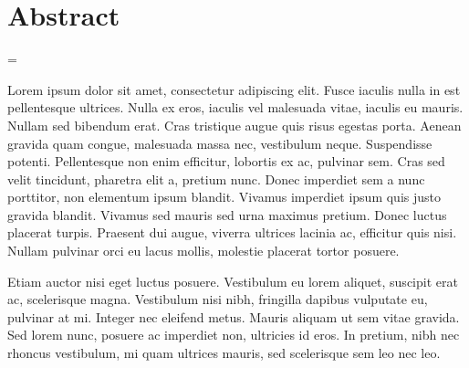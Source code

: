 \chapter*{Abstract}

\emergencystretch=\maxdimen
{}

Lorem ipsum dolor sit amet, consectetur adipiscing elit. Fusce iaculis nulla in est pellentesque ultrices. Nulla ex eros, iaculis vel malesuada vitae, iaculis eu mauris. Nullam sed bibendum erat. Cras tristique augue quis risus egestas porta. Aenean gravida quam congue, malesuada massa nec, vestibulum neque. Suspendisse potenti. Pellentesque non enim efficitur, lobortis ex ac, pulvinar sem. Cras sed velit tincidunt, pharetra elit a, pretium nunc. Donec imperdiet sem a nunc porttitor, non elementum ipsum blandit. Vivamus imperdiet ipsum quis justo gravida blandit. Vivamus sed mauris sed urna maximus pretium. Donec luctus placerat turpis. Praesent dui augue, viverra ultrices lacinia ac, efficitur quis nisi. Nullam pulvinar orci eu lacus mollis, molestie placerat tortor posuere.

Etiam auctor nisi eget luctus posuere. Vestibulum eu lorem aliquet, suscipit erat ac, scelerisque magna. Vestibulum nisi nibh, fringilla dapibus vulputate eu, pulvinar at mi. Integer nec eleifend metus. Mauris aliquam ut sem vitae gravida. Sed lorem nunc, posuere ac imperdiet non, ultricies id eros. In pretium, nibh nec rhoncus vestibulum, mi quam ultrices mauris, sed scelerisque sem leo nec leo.